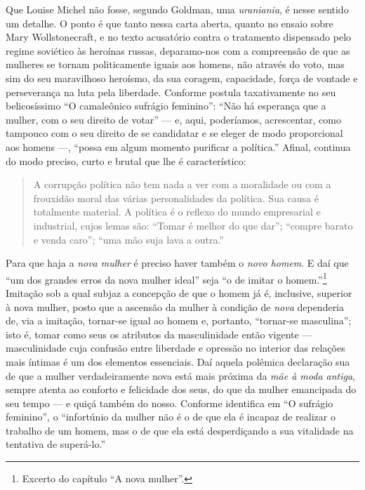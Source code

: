 Que Louise Michel não fosse, segundo Goldman, uma \textit{uraniania}, é nesse
sentido um detalhe. O ponto é que tanto nessa carta aberta, quanto no
ensaio sobre Mary Wollstonecraft, e no texto acusatório contra o
tratamento dispensado pelo regime soviético às heroínas russas,
deparamo-nos com a compreensão de que as mulheres se tornam
politicamente iguais aos homens, não através do voto, mas sim do seu
maravilhoso heroísmo, da sua coragem, capacidade, força de vontade e
perseverança na luta pela liberdade. Conforme postula taxativamente no
seu belicosíssimo ``O camaleônico sufrágio feminino'': ``Não há
esperança que a mulher, com o seu direito de votar'' --- e, aqui,
poderíamos, acrescentar, como tampouco com o seu direito de se
candidatar e se eleger de modo proporcional aos homens ---, ``possa em
algum momento purificar a política.'' Afinal, continua do modo preciso,
curto e brutal que lhe é característico:

\begin{quote}
A corrupção política não tem nada a ver com a moralidade ou com a
frouxidão moral das várias personalidades da política. Sua causa é
totalmente material. A política é o reflexo do mundo empresarial e
industrial, cujos lemas são: ``Tomar é melhor do que dar''; ``compre
barato e venda caro''; ``uma mão suja lava a outra.''
\end{quote}

Para que haja a \textit{nova mulher} é preciso haver também o \textit{novo homem}. E
daí que ``um dos grandes erros da nova mulher ideal'' seja ``o de imitar
o homem.''\footnote{Excerto do capítulo ``A nova mulher''.} Imitação sob a qual subjaz a concepção de
que o homem já é, inclusive, superior à nova mulher, posto que a
ascensão da mulher à condição de \textit{nova} dependeria de, via a imitação,
tornar-se igual ao homem e, portanto, ``tornar-se masculina''; isto é,
tomar como seus os atributos da masculinidade então vigente ---
masculinidade cuja confusão entre liberdade e opressão no interior das
relações mais íntimas é um dos elementos essenciais. Daí aquela polêmica
declaração sua de que a mulher verdadeiramente nova está mais próxima da
\textit{mãe à moda antiga}, sempre atenta ao conforto e felicidade dos seus,
do que da mulher emancipada do seu tempo --- e quiçá também do nosso.
Conforme identifica em ``O sufrágio feminino'', o ``infortúnio da mulher
não é o de que ela é incapaz de realizar o trabalho de um homem, mas o
de que ela está desperdiçando a sua vitalidade na tentativa de
superá-lo.''

